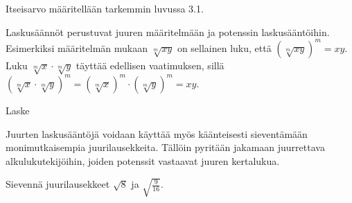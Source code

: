 Itseisarvo määritellään tarkemmin luvussa 3.1. %

Laskusäännöt perustuvat juuren määritelmään ja potenssin laskusääntöihin. Esimerkiksi määritelmän mukaan $\sqrt[m]{xy}$ on sellainen luku, että $\left( \sqrt[m]{xy} \right)^m = xy$. Luku $\sqrt[m]{x} \cdot \sqrt[m]{y}$ täyttää edellisen vaatimuksen, sillä $\left( \sqrt[m]{x} \cdot \sqrt[m]{y} \right)^m = \left( \sqrt[m]{x} \right)^m \cdot \left( \sqrt[m]{y} \right)^m = xy$.

\begin{esimerkki}
Laske

\begin{esimratk}
\end{esimratk}

\begin{esimvast}
\end{esimvast}
\end{esimerkki}

Juurten laskusääntöjä voidaan käyttää myös käänteisesti sieventämään monimutkaisempia juurilausekkeita. Tällöin pyritään jakamaan juurrettava alkulukutekijöihin, joiden potenssit vastaavat juuren kertalukua.

\begin{esimerkki}
Sievennä juurilausekkeet $\sqrt{8}$ ja $\sqrt{\frac{9}{16}}$. %

	\begin{esimratk}
	\end{esimratk}

\end{esimerkki}